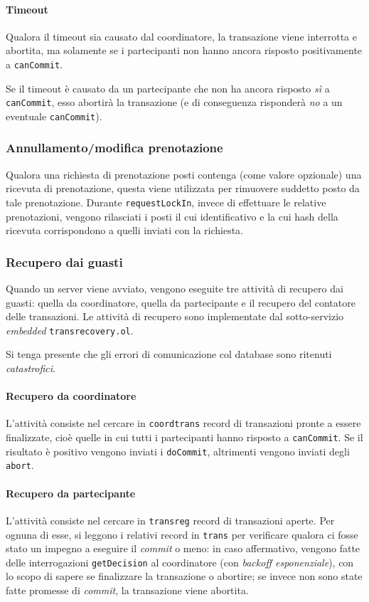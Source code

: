 \documentclass[a4paper]{article}
\begin{document}
\paragraph{Timeout}
Qualora il timeout sia causato dal coordinatore, la transazione viene interrotta e abortita, ma solamente se i partecipanti non hanno ancora risposto positivamente a \texttt{canCommit}.

Se il timeout è causato da un partecipante che non ha ancora risposto \textit{sì} a \texttt{canCommit}, esso abortirà la transazione (e di conseguenza risponderà \textit{no} a un eventuale \texttt{canCommit}).

\subsubsection{Annullamento/modifica prenotazione}
Qualora una richiesta di prenotazione posti contenga (come valore opzionale) una ricevuta di prenotazione, questa viene utilizzata per rimuovere suddetto posto da tale prenotazione. Durante \texttt{requestLockIn}, invece di effettuare le relative prenotazioni, vengono rilasciati i posti il cui identificativo e la cui hash della ricevuta corrispondono a quelli inviati con la richiesta.


\subsubsection{Recupero dai guasti}

Quando un server viene avviato, vengono eseguite tre attività di recupero dai guasti: quella da coordinatore, quella da partecipante e il recupero del contatore delle transazioni. Le attività di recupero sono implementate dal sotto-servizio \textit{embedded} \texttt{transrecovery.ol}.

Si tenga presente che gli errori di comunicazione col database sono ritenuti \textit{catastrofici}.

\paragraph{Recupero da coordinatore} L'attività consiste nel cercare in \texttt{coordtrans} record di transazioni pronte a essere finalizzate, cioè quelle in cui tutti i partecipanti hanno risposto a \texttt{canCommit}. Se il risultato è positivo vengono inviati i \texttt{doCommit}, altrimenti vengono inviati degli \texttt{abort}.

\paragraph{Recupero da partecipante} L'attività consiste nel cercare in \texttt{transreg} record di transazioni aperte. Per ognuna di esse, si leggono i relativi record in \texttt{trans} per verificare qualora ci fosse stato un impegno a eseguire il \textit{commit} o meno: in caso affermativo, vengono fatte delle interrogazioni \texttt{getDecision} al coordinatore (con \textit{backoff esponenziale}), con lo scopo di sapere se finalizzare la transazione o abortire; se invece non sono state fatte promesse di \textit{commit}, la transazione viene abortita.
\end{document}

